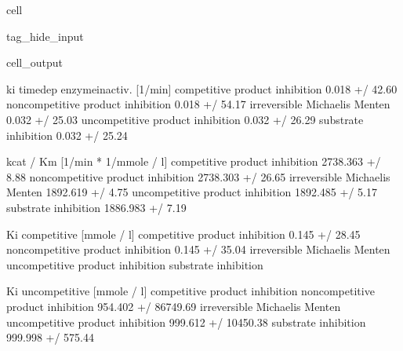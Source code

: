 \documentclass[letterpaper,10pt,english]{jupyterBook}
\begin{document}
\begin{sphinxuseclass}{cell}
\begin{sphinxuseclass}{tag_hide_input}
\begin{sphinxVerbatimOutput}
\begin{sphinxuseclass}{cell_output}
\begin{sphinxVerbatim}[commandchars=\\\{\}]
                                   ki time\PYGZhy{}dep enzyme\PYGZhy{}inactiv. [1/min]  \PYGZbs{}
competitive product inhibition                        0.018 +/\PYGZhy{} 42.60\PYGZpc{}   
non\PYGZhy{}competitive product inhibition                    0.018 +/\PYGZhy{} 54.17\PYGZpc{}   
irreversible Michaelis Menten                         0.032 +/\PYGZhy{} 25.03\PYGZpc{}   
uncompetitive product inhibition                      0.032 +/\PYGZhy{} 26.29\PYGZpc{}   
substrate inhibition                                  0.032 +/\PYGZhy{} 25.24\PYGZpc{}   

                                   kcat / Km [1/min * 1/mmole / l]  \PYGZbs{}
competitive product inhibition                  2738.363 +/\PYGZhy{} 8.88\PYGZpc{}   
non\PYGZhy{}competitive product inhibition             2738.303 +/\PYGZhy{} 26.65\PYGZpc{}   
irreversible Michaelis Menten                   1892.619 +/\PYGZhy{} 4.75\PYGZpc{}   
uncompetitive product inhibition                1892.485 +/\PYGZhy{} 5.17\PYGZpc{}   
substrate inhibition                            1886.983 +/\PYGZhy{} 7.19\PYGZpc{}   

                                   Ki competitive [mmole / l]  \PYGZbs{}
competitive product inhibition               0.145 +/\PYGZhy{} 28.45\PYGZpc{}   
non\PYGZhy{}competitive product inhibition           0.145 +/\PYGZhy{} 35.04\PYGZpc{}   
irreversible Michaelis Menten                               \PYGZhy{}   
uncompetitive product inhibition                            \PYGZhy{}   
substrate inhibition                                        \PYGZhy{}   

                                   Ki uncompetitive [mmole / l]  
competitive product inhibition                                \PYGZhy{}  
non\PYGZhy{}competitive product inhibition        954.402 +/\PYGZhy{} 86749.69\PYGZpc{}  
irreversible Michaelis Menten                                 \PYGZhy{}  
uncompetitive product inhibition          999.612 +/\PYGZhy{} 10450.38\PYGZpc{}  
substrate inhibition                        999.998 +/\PYGZhy{} 575.44\PYGZpc{}  
\end{sphinxVerbatim}

\end{sphinxuseclass}\end{sphinxVerbatimOutput}

\end{sphinxuseclass}
\end{sphinxuseclass}
\end{document}
